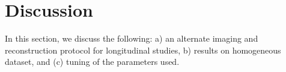 \documentclass[journal]{IEEEtran}
\begin{document}
\section{Discussion}
\label{sec:discussion}
In this section, we discuss the following:  a) an alternate imaging and reconstruction protocol for longitudinal studies, b) results on homogeneous dataset, and (c) tuning of the parameters used.

\end{document}
